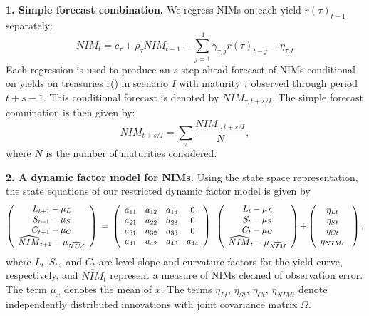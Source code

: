 \documentclass[11pt]{article}
\begin{document}
\vspace{-0.1in}
\noindent \textbf{1. Simple forecast combination.} We regress NIMs on each yield $r(\tau )_{t-1}$ separately: \
\[
NIM_{t}=c_{\tau }+\rho _{\tau }NIM_{t-1}+\sum_{j=1}^4\gamma _{\tau,j}r(\tau)_{t-j}+{\eta
_{\tau ,t}}
\]
Each regression is used to produce an $s$ step-ahead forecast of NIMs conditional on yields on treasuries r(\tau) in scenario $I$ with maturity $\tau$ observed through period $t+s-1.$ This conditional forecast is denoted by $NIM_{\tau,t+s/I}.$ The simple forecast comnination is then given by:
\[
NIM_{t+s/I}=\sum_{\tau }\frac{NIM_{\tau ,t+s/I}}{N},
\]
where $N$ is the number of maturities considered.

\noindent \textbf{2. A dynamic factor model for NIMs.} Using the state space representation, the state equations of our restricted dynamic factor model is given by
\[
\left(
\begin{array}{c}
{L_{t+1}-\mu _{L}} \\
{S_{t+1}-\mu _{S}} \\
{C_{t+1}-\mu _{C}} \\
\widehat{NIM}_{t+1}-\mu _{\widehat{NIM}}%
\end{array}%
\right) {\normalsize \ =\ }\left(
\begin{array}{cccc}
a_{11} & a_{12} & a_{13} & 0 \\
a_{21} & a_{22} & a_{23} & 0 \\
a_{31} & a_{32} & a_{33} & 0 \\
a_{41} & a_{42} & a_{43} & a_{44}%
\end{array}%
\right) {\normalsize \ }\left(
\begin{array}{c}
{L_{t}-\mu _{L}} \\
{S_{t}-\mu _{S}} \\
{C_{t}-\mu _{C}} \\
\widehat{NIM}_{t}-\mu _{\widehat{NIM}}%
\end{array}%
\right) {\normalsize +}\left(
\begin{array}{c}
{\eta _{Lt}} \\
{\eta _{St}} \\
{\eta _{Ct}} \\
{\eta _{NIMt}}%
\end{array}%
{\normalsize \ }\right) ,
\]
where $L_{t},S_{t},$ and $C_{t}$ are level slope and curvature factors for the yield curve, respectively, and $\widehat{NIM}_{t}$ represent a measure of NIMs cleaned of observation error. The term $\mu _{x}$ denotes the mean of $x$. The terms ${\eta _{Lt}}$, ${\eta _{St}}$, ${\eta _{Ct}}$, ${\eta_{NIMt}}$ denote independently distributed innovations with joint covariance matrix $\Omega $.
\end{document}
